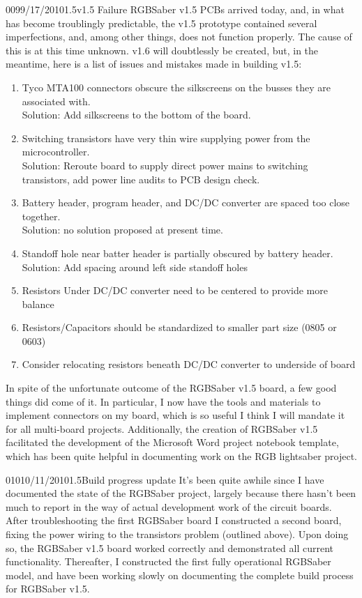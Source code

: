 \documentclass[12pt,letterpaper,onecolumn]{article}
\begin{document}
\begin{nbentry}{009}{9/17/2010}{1.5}{v1.5 Failure}
\indent RGBSaber v1.5 PCBs arrived today, and, in what has become troublingly predictable, the v1.5 prototype contained several imperfections, and, among other things, does not function properly. The cause of this is at this time unknown. v1.6 will doubtlessly be created, but, in the meantime, here is a list of issues and mistakes made in building v1.5:
\begin{enumerate}
\item Tyco MTA100 connectors obscure the silkscreens on the busses they are associated with. \\
	Solution: Add silkscreens to the bottom of the board.
\item Switching transistors have very thin wire supplying power from the microcontroller. \\
	Solution: Reroute board to supply direct power mains to switching transistors, add power line audits to PCB design check.
\item Battery header, program header, and DC/DC converter are spaced too close together. \\
	Solution: no solution proposed at present time.
\item Standoff hole near batter header is partially obscured by battery header. \\
	Solution: Add spacing around left side standoff holes
\item Resistors Under DC/DC converter need to be centered to provide more balance
\item Resistors/Capacitors should be standardized to smaller part size (0805 or 0603)
\item Consider relocating resistors beneath DC/DC converter to underside of board
\end{enumerate}
\indent In spite of the unfortunate outcome of the RGBSaber v1.5 board, a few good things did come of it. In particular, I now have the tools and materials to implement connectors on my board, which is so useful I think I will mandate it for all multi-board projects. Additionally, the creation of RGBSaber v1.5 facilitated the development of the Microsoft Word project notebook template, which has been quite helpful in documenting work on the RGB lightsaber project.
\end{nbentry}

\begin{nbentry}{010}{10/11/2010}{1.5}{Build progress update}
\indent It's been quite awhile since I have documented the state of the RGBSaber project, largely because there hasn't been much to report in the way of actual development work of the circuit boards. After troubleshooting the first RGBSaber board I constructed a second board, fixing the power wiring to the transistors problem (outlined above). Upon doing so, the RGBSaber v1.5 board worked correctly and demonstrated all current functionality. Thereafter, I constructed the first fully operational RGBSaber model, and have been working slowly on documenting the complete build process for RGBSaber v1.5.
\end{nbentry}
\end{document}

